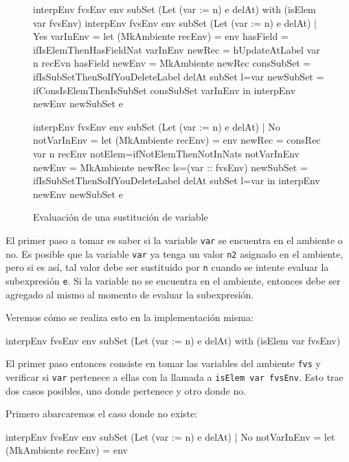 \begin{figure}[h]

\begin{code}
interpEnv {fvsEnv} env subSet (Let (var := n) e delAt)
    with (isElem var fvsEnv)
  interpEnv {fvsEnv} env subSet (Let (var := n) e delAt)
    | Yes varInEnv =
    let (MkAmbiente recEnv) = env
      hasField = ifIsElemThenHasFieldNat varInEnv 
      newRec = hUpdateAtLabel var n recEvn hasField
      newEnv = MkAmbiente newRec
      consSubSet =
        ifIsSubSetThenSoIfYouDeleteLabel delAt subSet {l=var}
      newSubSet = ifConsIsElemThenIsSubSet consSubSet varInEnv
    in interpEnv newEnv newSubSet e
 
  interpEnv {fvsEnv} env subSet (Let (var := n) e delAt)
    | No notVarInEnv =
    let (MkAmbiente recEnv) = env
      newRec = consRec var n recEnv
        {notElem=ifNotElemThenNotInNats notVarInEnv}
      newEnv = MkAmbiente newRec {ls=(var :: fvsEnv)}
      newSubSet =
        ifIsSubSetThenSoIfYouDeleteLabel delAt subSet {l=var}
    in interpEnv newEnv newSubSet e
\end{code}

\caption{Evaluación de una sustitución de variable}
\label{fig:InterpImplLet}
\end{figure}

El primer paso a tomar es saber si la variable \texttt{var} se encuentra en el ambiente o no. Es posible que la variable \texttt{var} ya tenga un valor \texttt{n2} asignado en el ambiente, pero si es así, tal valor debe ser sustituido por \texttt{n} cuando se intente evaluar la subexpresión \texttt{e}. Si la variable no se encuentra en el ambiente, entonces debe ser agregado al mismo al momento de evaluar la subexpresión.

Veremos cómo se realiza esto en la implementación misma:

\begin{code}
interpEnv {fvsEnv} env subSet (Let (var := n) e delAt)
    with (isElem var fvsEnv)
\end{code}

El primer paso entonces consiste en tomar las variables del ambiente \texttt{fvs} y verificar si \texttt{var} pertenece a ellas con la llamada a \texttt{isElem var fvsEnv}. Esto trae dos casos posibles, uno donde pertenece y otro donde no.

Primero abarcaremos el caso donde no existe:

\begin{code}
interpEnv {fvsEnv} env subSet (Let (var := n) e delAt)
  | No notVarInEnv =
  let (MkAmbiente recEnv) = env
\end{code}


